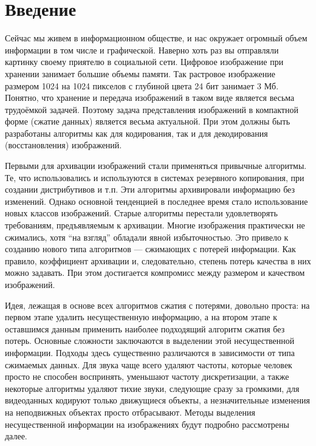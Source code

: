 





\newpage


\section*{Введение}

Сейчас мы живем в информационном обществе, и нас окружает огромный объем информации в том числе и графической. Наверно хоть раз вы отправляли картинку своему приятелю в социальной сети. Цифровое изображение при хранении занимает большие объемы памяти. Так растровое изображение размером 1024 на 1024 пикселов с глубиной цвета 24 бит занимает 3 Мб. Понятно, что хранение и передача изображений в таком виде является весьма трудоёмкой задачей. Поэтому задача представления изображений в компактной форме (сжатие данных) является весьма актуальной. При этом должны быть разработаны алгоритмы как для кодирования, так и для декодирования (восстановления) изображений. 
	
Первыми для архивации изображений стали применяться привычные алгоритмы. Те, что использовались и используются в системах резервного копирования, при создании дистрибутивов и т.п. Эти алгоритмы архивировали информацию без изменений. Однако основной тенденцией в последнее время стало использование новых классов изображений. Старые алгоритмы перестали удовлетворять требованиям, предъявляемым к архивации. Многие изображения практически не сжимались, хотя “на взгляд” обладали явной избыточностью. Это привело к созданию нового типа алгоритмов — сжимающих с потерей информации. Как правило, коэффициент архивации и, следовательно, степень потерь качества в них можно задавать. При этом достигается компромисс между размером и качеством изображений.
	
Идея, лежащая в основе всех алгоритмов сжатия с потерями, довольно проста: на первом этапе удалить несущественную информацию, а на втором этапе к оставшимся данным применить наиболее подходящий алгоритм сжатия без потерь. Основные сложности заключаются в выделении этой несущественной информации. Подходы здесь существенно различаются в зависимости от типа сжимаемых данных. Для звука чаще всего удаляют частоты, которые человек просто не способен воспринять, уменьшают частоту дискретизации, а также некоторые алгоритмы удаляют тихие звуки, следующие сразу за громкими, для видеоданных кодируют только движущиеся объекты, а незначительные изменения на неподвижных объектах просто отбрасывают. Методы выделения несущественной информации на изображениях будут подробно рассмотрены далее.

